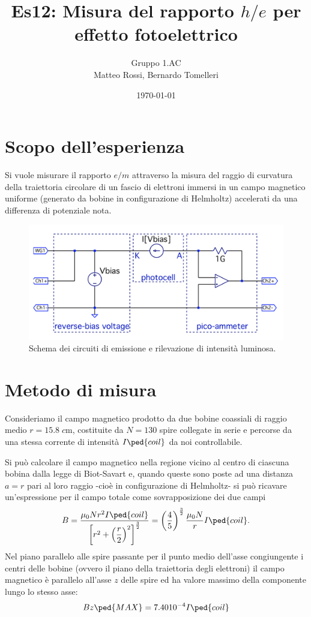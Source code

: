 \documentclass[10pt, a4paper, italian]{article}
\author{Gruppo 1.AC \\ Matteo Rossi, Bernardo Tomelleri}
\title{Es12: Misura del rapporto $h/e$ per effetto fotoelettrico}
\begin{document}
\date{\today}
\maketitle

\section{Scopo dell'esperienza}
Si vuole misurare il rapporto $e/m$ attraverso la misura del raggio di
curvatura della traiettoria circolare di un fascio di elettroni immersi in un
campo magnetico uniforme (generato da bobine in configurazione di Helmholtz)
accelerati da una differenza di potenziale nota.

\begin{figure}[htbp]
    \centering
	\includegraphics[scale=0.7]{schm}
    \caption{Schema dei circuiti di emissione e rilevazione di intensità
    luminosa.
    \label{schm: mesctrl}}
\end{figure}

\section{Metodo di misura}
Consideriamo il campo magnetico prodotto da due bobine coassiali di raggio
medio $r = 15.8 \; \si{c\m}$, costituite da $N = 130$ spire collegate in
serie e percorse da una stessa corrente di intensità $I\ped{coil}$ da noi
controllabile.

Si può calcolare il campo magnetico nella regione vicino al centro di ciascuna
bobina dalla legge di Biot-Savart e, quando queste sono poste ad una distanza
$a = r$ pari al loro raggio -cioè in configurazione di Helmholtz- si può
ricavare un'espressione per il campo totale come sovrapposizione dei due campi
\begin{equation}\label{eq: B-helm}
    B = \frac{\mu_0 N r^2 I\ped{coil}}{\left[r^2 + \left(\dfrac{r}{2}\right)^2
    \right]^\frac{3}{2}} =
    \left(\frac{4}{5}\right)^{\frac{3}{2}} \frac{\mu_{0} N}{r} I\ped{coil}.
\end{equation}
Nel piano parallelo alle spire passante per il punto medio dell'asse
congiungente i centri delle bobine (ovvero il piano della traiettoria degli
elettroni) il campo magnetico è parallelo all'asse $z$ delle spire ed ha
valore massimo della componente lungo lo stesso asse:
\[
Bz\ped{MAX} = 7.40 10^{-4} I\ped{coil}
\]
\end{document}
